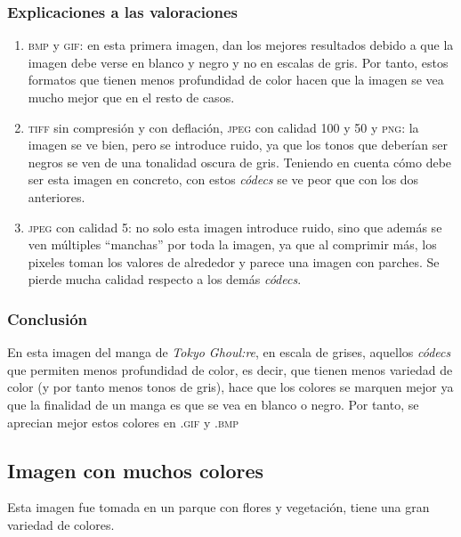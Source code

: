 \documentclass[11pt,a4paper]{article}
\begin{document}
\subsubsection{Explicaciones a las valoraciones}
\begin{enumerate}
	\item \textsc{bmp} y \textsc{gif}: en esta primera imagen, dan los mejores resultados debido a que la imagen debe verse en blanco y negro y no en escalas de gris. Por tanto, estos formatos que tienen menos profundidad de color hacen que la imagen se vea mucho mejor que en el resto de casos.
	\item \textsc{tiff} sin compresión y con deflación, \textsc{jpeg} con calidad 100 y 50 y \textsc{png}: la imagen se ve bien, pero se introduce ruido, ya que los tonos que deberían ser negros se ven de una tonalidad oscura de gris. Teniendo en cuenta cómo debe ser esta imagen en concreto, con estos \textit{códecs} se ve peor que con los dos anteriores.
	\item \textsc{jpeg} con calidad 5: no solo esta imagen introduce ruido, sino que además se ven múltiples ``manchas'' por toda la imagen, ya que al comprimir más, los pixeles toman los valores de alrededor y parece una imagen con parches. Se pierde mucha calidad respecto a los demás \textit{códecs}.
\end{enumerate}

\subsubsection{Conclusión}

En esta imagen del manga de \textit{Tokyo Ghoul:re}, en escala de grises, aquellos \textit{códecs} que permiten menos profundidad de color, es decir, que tienen menos variedad de color (y por tanto menos tonos de gris), hace que los colores se marquen mejor ya que la finalidad de un manga es que se vea en blanco o negro. Por tanto, se aprecian mejor estos colores en \textsc{.gif} y \textsc{.bmp}

\newpage

\subsection{Imagen con muchos colores}

Esta imagen fue tomada en un parque con flores y vegetación, tiene una gran variedad de colores.
\end{document}
